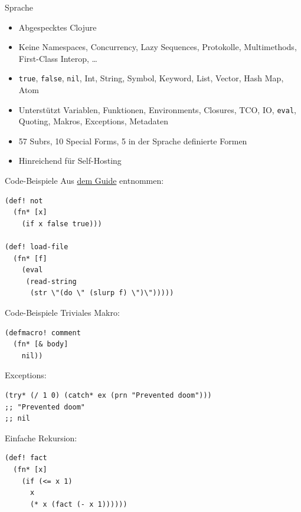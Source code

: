 \documentclass[presentation]{beamer}
\begin{document}
\begin{frame}[fragile,label=sec-2-3]{Sprache}
 \begin{itemize}
\item Abgespecktes Clojure
\item Keine Namespaces, Concurrency, Lazy Sequences, Protokolle,
Multimethods, First-Class Interop, \ldots{}
\item \texttt{true}, \texttt{false}, \texttt{nil}, Int, String, Symbol, Keyword, List, Vector,
Hash Map, Atom
\item Unterstützt Variablen, Funktionen, Environments, Closures, TCO, IO,
\texttt{eval}, Quoting, Makros, Exceptions, Metadaten
\item 57 Subrs, 10 Special Forms, 5 in der Sprache definierte Formen
\item Hinreichend für Self-Hosting
\end{itemize}
\end{frame}

\begin{frame}[fragile,label=sec-2-4]{Code-Beispiele}
 Aus \href{https://github.com/kanaka/mal/blob/master/process/guide.md}{dem Guide} entnommen:

\begin{verbatim}
(def! not
  (fn* [x]
    (if x false true)))

(def! load-file
  (fn* [f]
    (eval
     (read-string
      (str \"(do \" (slurp f) \")\")))))
\end{verbatim}
\end{frame}

\begin{frame}[fragile,label=sec-2-5]{Code-Beispiele}
 Triviales Makro:

\begin{verbatim}
(defmacro! comment
  (fn* [& body]
    nil))
\end{verbatim}

Exceptions:

\begin{verbatim}
(try* (/ 1 0) (catch* ex (prn "Prevented doom")))
;; "Prevented doom"
;; nil
\end{verbatim}

Einfache Rekursion:

\begin{verbatim}
(def! fact
  (fn* [x]
    (if (<= x 1)
      x
      (* x (fact (- x 1))))))
\end{verbatim}
\end{frame}
\end{document}
